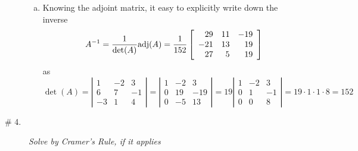 \documentclass[8pt]{article} %
\begin{document}
\begin{description}
{\begin{enumerate}[(a)]
\[\begin{array}{rr}
					6& -1\\
				\end{array}\right|=1\cdot(-1)-6\cdot3=-19\]
			\item Knowing the adjoint matrix, it easy to explicitly write down the inverse
				\[A^{-1}=\frac{1}{\det(A)}\mbox{adj}(A)=\frac{1}{152}
				\left[\begin{array}{rrr}
					29&11&-19\\
					-21&13&19\\
					27&5&19
				\end{array}\right]\]
				as
				\[
				\det(A)=\left|\begin{array}{rrr}
					1&-2&3\\6&7&-1\\-3&1&4
				\end{array}\right|=
				\left|\begin{array}{rrr}
					1&-2&3\\0&19&-19\\0&-5&13
				\end{array}\right|=
				19\left|\begin{array}{rrr}
					1&-2&3\\0&1&-1\\0&0&8
				\end{array}\right|=19\cdot1\cdot1\cdot8=152
				\]
		\end{enumerate}
		}
	\item[\# 4.]{{\it Solve by Cramer's Rule, if it applies
		}
		}
\end{description}
\end{document}
